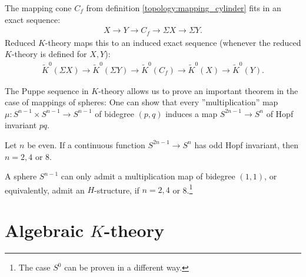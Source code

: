 {    \begin{property}
        The mapping cone $C_f$ from definition \ref{topology:mapping_cylinder} fits in an exact sequence:
        \begin{gather}
            X\longrightarrow Y\longrightarrow C_f\longrightarrow \Sigma X\longrightarrow \Sigma Y.
        \end{gather}
        Reduced $K$-theory maps this to an induced exact sequence (whenever the reduced $K$-theory is defined for $X,Y$):
        \begin{gather}
            \widetilde{K}^0(\Sigma X)\longrightarrow\widetilde{K}^0(\Sigma Y)\longrightarrow \widetilde{K}^0(C_f)\longrightarrow\widetilde{K}^0(X)\longrightarrow\widetilde{K}^0(Y).
        \end{gather}
    \end{property}
    The Puppe sequence in $K$-theory allows us to prove an important theorem in the case of mappings of spheres:
     One can show that every ''multiplication'' map $\mu: S^{n-1}\times S^{n-1}\rightarrow S^{n-1}$ of bidegree $(p,q)$ induces a map $S^{2n-1}\rightarrow S^n$ of Hopf invariant $pq$.

     \begin{theorem}
         Let $n$ be even. If a continuous function $S^{2n-1}\rightarrow S^n$ has odd Hopf invariant, then $n=2,4$ or 8.
     \end{theorem}
     \begin{result}
         A sphere $S^{n-1}$ can only admit a multiplication map of bidegree $(1,1)$, or equivalently, admit an $H$-structure, if $n=2,4$ or 8.\footnote{The case $S^0$ can be proven in a different way.}
     \end{result}

\section{\texorpdfstring{Algebraic $K$-theory}{Algebraic K-theory}}
}

